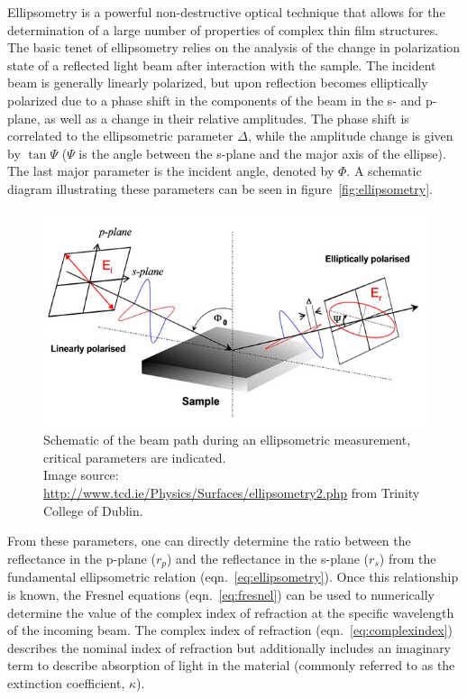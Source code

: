 Ellipsometry is a powerful non-destructive optical technique that allows for the determination of a large number of properties of complex thin film structures. The basic tenet of ellipsometry relies on the analysis of the change in polarization state of a reflected light beam after interaction with the sample. The incident beam is generally linearly polarized, but upon reflection becomes elliptically polarized due to a phase shift in the components of the beam in the s- and p-plane, as well as a change in their relative amplitudes. The phase shift is correlated to the ellipsometric parameter $\Delta$, while the amplitude change is given by $\tan\Psi$ ($\Psi$ is the angle between the s-plane and the major axis of the ellipse). The last major parameter is the incident angle, denoted by $\Phi$. A schematic diagram illustrating these parameters can be seen in figure~\vref{fig:ellipsometry}.\cite{azzam_ellipsometry_1987,schubert_infrared_2005,tompkins_spectroscopic_1999} 

\begin{figure}[tb]
   \centering
   \includegraphics[width=\linewidth]{./figures/characterization/ellipsometryDiagram_simple} 
   \caption[Ellipsometric Beam Path and Modeling Parameters]{Schematic of the beam path during an %
   					ellipsometric measurement, \\ critical parameters are indicated.\\
					{\tiny Image source: \url{http://www.tcd.ie/Physics/Surfaces/ellipsometry2.php} %
					from Trinity College of Dublin.\cite{trinity_college_dublin}}}
   \label{fig:ellipsometry}
\end{figure}

From these parameters, one can directly determine the ratio between the reflectance in the p-plane ($r_{p}$) and the reflectance in the s-plane ($r_{s}$) from the fundamental ellipsometric relation (eqn.~\vref{eq:ellipsometry}).  Once this relationship is known, the Fresnel equations (eqn.~\vref{eq:fresnel}) can be used to numerically determine the value of the complex index of refraction at the specific wavelength of the incoming beam. The complex index of refraction (eqn.~\vref{eq:complexindex}) describes the nominal index of refraction but additionally includes an imaginary term to describe absorption of light in the material (commonly referred to as the extinction coefficient, $\kappa$).\cite{azzam_ellipsometry_1987,schubert_infrared_2005,tompkins_spectroscopic_1999}  

